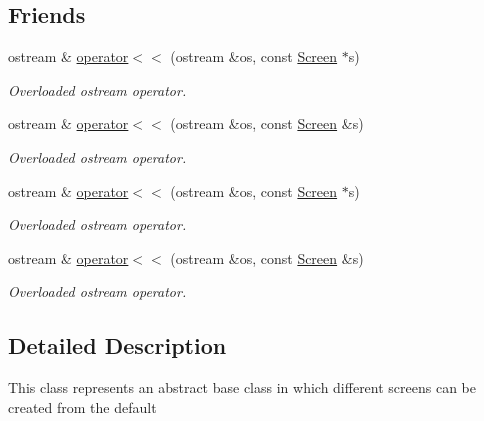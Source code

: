 \subsection*{Friends}
\begin{DoxyCompactItemize}
\item 
\hypertarget{classScreen_a9d1583ec176b804e06d7c6d2a8bf3bcd}{ostream \& \hyperlink{classScreen_a9d1583ec176b804e06d7c6d2a8bf3bcd}{operator$<$$<$} (ostream \&os, const \hyperlink{classScreen}{Screen} $\ast$s)}\label{classScreen_a9d1583ec176b804e06d7c6d2a8bf3bcd}

\begin{DoxyCompactList}\small\item\em Overloaded ostream operator. \end{DoxyCompactList}\item 
\hypertarget{classScreen_adb701ccee14124fb66506086b5a34199}{ostream \& \hyperlink{classScreen_adb701ccee14124fb66506086b5a34199}{operator$<$$<$} (ostream \&os, const \hyperlink{classScreen}{Screen} \&s)}\label{classScreen_adb701ccee14124fb66506086b5a34199}

\begin{DoxyCompactList}\small\item\em Overloaded ostream operator. \end{DoxyCompactList}\item 
\hypertarget{classScreen_a9d1583ec176b804e06d7c6d2a8bf3bcd}{ostream \& \hyperlink{classScreen_a9d1583ec176b804e06d7c6d2a8bf3bcd}{operator$<$$<$} (ostream \&os, const \hyperlink{classScreen}{Screen} $\ast$s)}\label{classScreen_a9d1583ec176b804e06d7c6d2a8bf3bcd}

\begin{DoxyCompactList}\small\item\em Overloaded ostream operator. \end{DoxyCompactList}\item 
\hypertarget{classScreen_adb701ccee14124fb66506086b5a34199}{ostream \& \hyperlink{classScreen_adb701ccee14124fb66506086b5a34199}{operator$<$$<$} (ostream \&os, const \hyperlink{classScreen}{Screen} \&s)}\label{classScreen_adb701ccee14124fb66506086b5a34199}

\begin{DoxyCompactList}\small\item\em Overloaded ostream operator. \end{DoxyCompactList}\end{DoxyCompactItemize}


\subsection{Detailed Description}
This class represents an abstract base class in which different screens can be created from the default 

